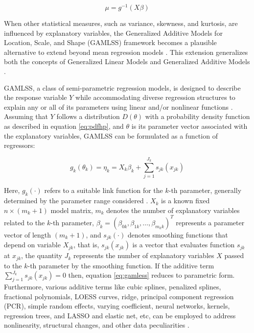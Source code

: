\begin{equation}
\mu = g^{-1}(X \beta) 
\label{eq:ginv}
\end{equation}

When other statistical measures, such as variance, skewness, and kurtosis, are influenced by explanatory variables, the Generalized Additive Models for Location, Scale, and Shape (GAMLSS) framework becomes a plausible alternative to extend beyond mean regression models \citep[\citet{Ramires2021}]{Kneib2013}. This extension generalizes both the concepts of Generalized Linear Models \citep{Nelder1972} and Generalized Additive Models \citep{Hastie1990}.

GAMLSS, a class of semi-parametric regression models, is designed to describe the response variable \(Y\) while accommodating diverse regression structures to explain any or all of its parameters using linear and/or nonlinear functions \citep{Rigby2005}. Assuming that \(Y\) follows a distribution \(D(\theta)\) with a probability density function as described in equation \eqref{eq:pdfhp}, and \(\theta\) is its parameter vector associated with the explanatory variables, GAMLSS can be formulated as a function of regressors:

\begin{equation}
 g_k (\theta_k) = \eta_k = X_k \beta_k + \sum_{j=1}^{J_k} s_{jk} (x_{jk}) 
  \label{eq:gamless}
\end{equation}

Here, \(g_k(\cdot)\) refers to a suitable link function for the \(k\)-th parameter, generally determined by the parameter range considered \citep{Stasinopoulos2017}. \(X_{k}\) is a known fixed \(n \times (m_{k} + 1)\) model matrix, \(m_{k}\) denotes the number of explanatory variables related to the \(k\)-th parameter, \(\beta_{k} = (\beta_{0k}, \beta_{1k}, \dots, \beta_{m_{k}k})^T\) represents a parameter vector of length \((m_{k} +1)\), and \(s_{jk}(\cdot)\) denotes smoothing functions that depend on variable \(X_{jk}\), that is, \(s_{jk} (x_{jk})\) is a vector that evaluates function \(s_{jk}\) at \(x_{jk}\), the quantity \(J_k\) represents the number of explanatory variables \(X\) passed to the \(k\)-th parameter by the smoothing function. If the additive term \(\sum_{j=1}^{J_k} s_{jk} (x_{jk}) = 0\) then, equation \eqref{eq:gamless} reduces to parametric form. Furthermore, various additive terms like cubic splines, penalized splines, fractional polynomials, LOESS curves, ridge, principal component regression (PCR), simple random effects, varying coefficient, neural networks, kernels, regression trees, and LASSO and elastic net, etc, can be employed to address nonlinearity, structural changes, and other data peculiarities \citep{gamlss.book.2024}.

